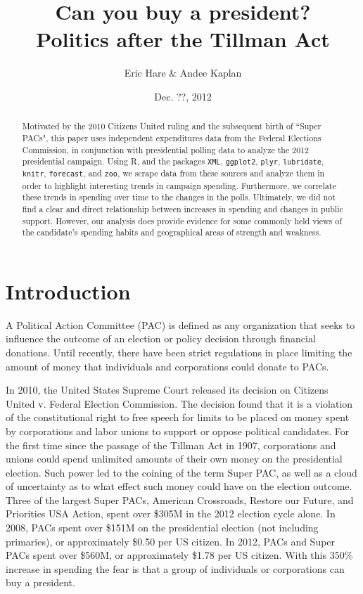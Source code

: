 \documentclass[11pt]{article}\usepackage{graphicx, color}
\begin{document}
\setlength{\parskip}{3ex}
\setlength{\parindent}{0pt}

\title{Can you buy a president? \\ \vspace{.6cm} \Large Politics after the Tillman Act}
\author{Eric Hare \& Andee Kaplan}
\date{Dec. ??, 2012}

\maketitle
\thispagestyle{empty}
\begin{abstract}
Motivated by the 2010 Citizens United ruling and the subsequent birth of ``Super PACs", this paper uses independent expenditures data from the Federal Elections Commission, in conjunction with presidential polling data to analyze the 2012 presidential campaign. Using R, and the packages \texttt{XML}, \texttt{ggplot2}, \texttt{plyr}, \texttt{lubridate}, \texttt{knitr}, \texttt{forecast}, and \texttt{zoo}, we scrape data from these sources and analyze them in order to highlight interesting trends in campaign spending. Furthermore, we correlate these trends in spending over time to the changes in the polls. Ultimately, we did not find a clear and direct relationship between increases in spending and changes in public support. However, our analysis does provide evidence for some commonly held views of the candidate's spending habits and geographical areas of strength and weakness.
\end{abstract}
\clearpage

\setcounter{page}{1}
\section{Introduction}
A Political Action Committee (PAC) is defined as any organization that seeks to influence the outcome of an election or policy decision through financial donations. Until recently, there have been strict regulations in place limiting the amount of money that individuals and corporations could donate to PACs.

In 2010, the United States Supreme Court released its decision on Citizens United v. Federal Election Commission. The decision found that it is a violation of the constitutional right to free speech for limits to be placed on money spent by corporations and labor unions to support or oppose political candidates. For the first time since the passage of the Tillman Act in 1907, corporations and unions could spend unlimited amounts of their own money on the presidential election. Such power led to the coining of the term Super PAC, as well as a cloud of uncertainty as to what effect such money could have on the election outcome. Three of the largest Super PACs, American Crossroads, Restore our Future, and Priorities USA Action, spent over \$305M in the 2012 election cycle alone. In 2008, PACs spent over \$151M on the presidential election (not including primaries), or approximately \$0.50 per US citizen. In 2012, PACs and Super PACs spent over \$560M, or approximately \$1.78 per US citizen. With this 350\% increase in spending the fear is that a group of individuals or corporations can buy a president.
\end{document}
